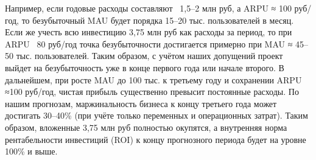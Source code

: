 Например, если годовые расходы составляют ~1,5–2 млн руб, а ARPU ≈ 100 руб/год, то безубыточный MAU будет порядка 15–20 тыс. пользователей в месяц. Если же учесть всю инвестицию 3,75 млн руб как расходы за период, то при ARPU ~80 руб/год точка безубыточности достигается примерно при MAU ≈ 45–50 тыс. пользователей. Таким образом, с учётом наших допущений проект выйдет на безубыточность уже в конце первого года или начале второго. В дальнейшем, при росте MAU до 100 тыс. к третьему году и сохранении ARPU ≈100 руб/год, чистая прибыль существенно превысит постоянные расходы. По нашим прогнозам, маржинальность бизнеса к концу третьего года может достигать 30–40\% (при учёте только переменных и операционных затрат). Таким образом, вложенные 3,75 млн руб полностью окупятся, а внутренняя норма рентабельности инвестиций (ROI) к концу прогнозного периода будет на уровне 100\% и выше.

